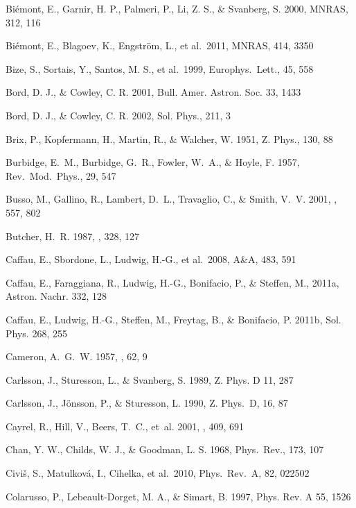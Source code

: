 \documentclass[traditabstract]{aa}
\begin{document}
\begin{thebibliography}{}
  Bi\'emont, E., Garnir, H. P., Palmeri, P., Li, Z. S., \& Svanberg, S. 2000, MNRAS, 312, 116
 
  Bi\'emont, E., Blagoev, K., Engstr\"{o}m, L., et al.\ 2011, MNRAS, 414, 3350

  Bize, S., Sortais, Y., Santos, M. S., et al.\ 1999, Europhys.\ Lett., 45, 558

  Bord, D. J., \& Cowley, C. R. 2001, Bull. Amer. Astron. Soc. 33, 1433

  Bord, D. J., \& Cowley, C. R. 2002, Sol. Phys., 211, 3

  Brix, P., Kopfermann, H., Martin, R., \& Walcher, W. 1951, Z. Phys., 130, 88

  {Burbidge}, E.~M., {Burbidge}, G.~R., {Fowler}, W.~A., \& {Hoyle}, F. 1957, Rev.\ Mod.\ Phys., 29, 547

  {Busso}, M., {Gallino}, R., {Lambert}, D.~L., {Travaglio}, C., \& {Smith}, V.~V. 2001, \apj, 557, 802

  {Butcher}, H.~R. 1987, \nat, 328, 127

  Caffau, E., Sbordone, L., Ludwig, H.-G., et al.\ 2008, A\&A, 483, 591

  Caffau, E., Faraggiana, R., Ludwig, H.-G., Bonifacio, P., \& Steffen, M., 2011a, Astron. Nachr. 332, 128

  Caffau, E., Ludwig, H.-G., Steffen, M., Freytag, B., \& Bonifacio, P.  2011b, Sol. Phys. 268, 255

  {Cameron}, A.~G.~W. 1957, \aj, 62, 9

  Carlsson, J., Sturesson, L., \& Svanberg, S. 1989, Z. Phys. D 11, 287

  Carlsson, J., J\"onsson, P., \& Sturesson, L. 1990, Z. Phys.\ D, 16, 87

  {Cayrel}, R., {Hill}, V., {Beers}, T.~C., {et~al.} 2001, \nat, 409, 691

  Chan, Y. W., Childs, W. J., \& Goodman, L. S. 1968, Phys.\ Rev., 173, 107

  Civi\v{s}, S., Matulkov\'a, I., Cihelka, et al.\ 2010, Phys.\ Rev.\ A, 82, 022502

  Colarusso, P., Lebeault-Dorget, M. A., \& Simart, B. 1997, Phys. Rev. A 55, 1526


\end{thebibliography}
\end{document}

